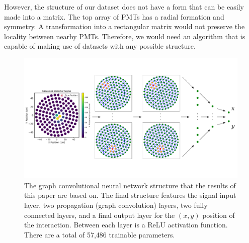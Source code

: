 \documentclass[thesis.tex]{subfiles}
\begin{document}
\par However, the structure of our dataset does not have a form that can be easily made into a matrix.
The top array of PMTs has a radial formation and symmetry.
A transformation into a rectangular matrix would not preserve the locality between nearby PMTs.
Therefore, we would need an algorithm that is capable of making use of datasets with any possible structure.
\begin{figure}[t]
	\centering
	\includegraphics[width=\linewidth]{figures/gcnn_architecture.pdf}
	\caption{
	The graph convolutional neural network structure that the results of this paper are based on.
	The final structure features the signal input layer, two propagation (graph convolution) layers, two fully connected layers, and a final output layer for the $(x,y)$ position of the interaction.
	Between each layer is a ReLU activation function.
	There are a total of 57,486 trainable parameters.
	}
	\label{fig:figures/GCNN_Structure}
\end{figure}
\end{document}
